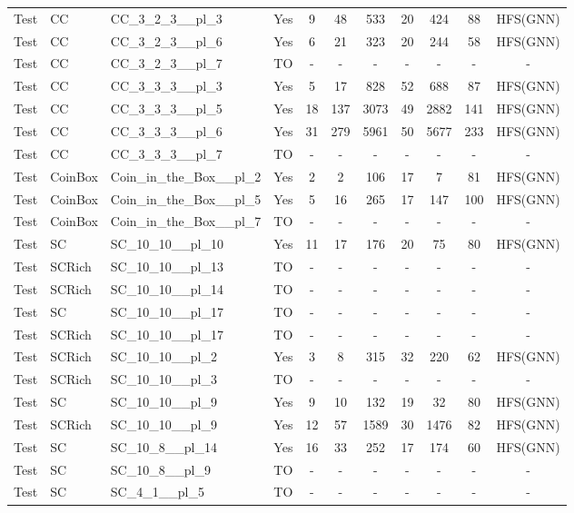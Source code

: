 \documentclass{article}
\begin{document}
\begin{tabular}{lllcccccccc}
Test & CC & CC\_3\_2\_3\_\_pl\_3 & Yes & 9 & 48 & 533 & 20 & 424 & 88 & HFS(GNN) \\
Test & CC & CC\_3\_2\_3\_\_pl\_6 & Yes & 6 & 21 & 323 & 20 & 244 & 58 & HFS(GNN) \\
Test & CC & CC\_3\_2\_3\_\_pl\_7 & TO & - & - & - & - & - & - & - \\
Test & CC & CC\_3\_3\_3\_\_pl\_3 & Yes & 5 & 17 & 828 & 52 & 688 & 87 & HFS(GNN) \\
Test & CC & CC\_3\_3\_3\_\_pl\_5 & Yes & 18 & 137 & 3073 & 49 & 2882 & 141 & HFS(GNN) \\
Test & CC & CC\_3\_3\_3\_\_pl\_6 & Yes & 31 & 279 & 5961 & 50 & 5677 & 233 & HFS(GNN) \\
Test & CC & CC\_3\_3\_3\_\_pl\_7 & TO & - & - & - & - & - & - & - \\
Test & CoinBox & Coin\_in\_the\_Box\_\_pl\_2 & Yes & 2 & 2 & 106 & 17 & 7 & 81 & HFS(GNN) \\
Test & CoinBox & Coin\_in\_the\_Box\_\_pl\_5 & Yes & 5 & 16 & 265 & 17 & 147 & 100 & HFS(GNN) \\
Test & CoinBox & Coin\_in\_the\_Box\_\_pl\_7 & TO & - & - & - & - & - & - & - \\
Test & SC & SC\_10\_10\_\_pl\_10 & Yes & 11 & 17 & 176 & 20 & 75 & 80 & HFS(GNN) \\
Test & SCRich & SC\_10\_10\_\_pl\_13 & TO & - & - & - & - & - & - & - \\
Test & SCRich & SC\_10\_10\_\_pl\_14 & TO & - & - & - & - & - & - & - \\
Test & SC & SC\_10\_10\_\_pl\_17 & TO & - & - & - & - & - & - & - \\
Test & SCRich & SC\_10\_10\_\_pl\_17 & TO & - & - & - & - & - & - & - \\
Test & SCRich & SC\_10\_10\_\_pl\_2 & Yes & 3 & 8 & 315 & 32 & 220 & 62 & HFS(GNN) \\
Test & SCRich & SC\_10\_10\_\_pl\_3 & TO & - & - & - & - & - & - & - \\
Test & SC & SC\_10\_10\_\_pl\_9 & Yes & 9 & 10 & 132 & 19 & 32 & 80 & HFS(GNN) \\
Test & SCRich & SC\_10\_10\_\_pl\_9 & Yes & 12 & 57 & 1589 & 30 & 1476 & 82 & HFS(GNN) \\
Test & SC & SC\_10\_8\_\_pl\_14 & Yes & 16 & 33 & 252 & 17 & 174 & 60 & HFS(GNN) \\
Test & SC & SC\_10\_8\_\_pl\_9 & TO & - & - & - & - & - & - & - \\
Test & SC & SC\_4\_1\_\_pl\_5 & TO & - & - & - & - & - & - & - \\

\end{tabular}
\end{document}
